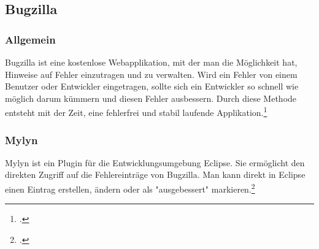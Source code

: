 
\subsection{Bugzilla}

\subsubsection{Allgemein}
Bugzilla ist eine kostenlose Webapplikation, mit der man die Möglichkeit hat, Hinweise auf Fehler einzutragen und zu verwalten. Wird ein Fehler von einem Benutzer oder Entwickler eingetragen, sollte sich ein Entwickler so schnell wie möglich darum kümmern und diesen Fehler ausbessern. Durch diese Methode entsteht mit der Zeit, eine fehlerfrei und stabil laufende Applikation.\footcite[vgl.][]{bugzilla}
\subsubsection{Mylyn}
Mylyn ist ein Plugin für die Entwicklungsumgebung Eclipse. Sie ermöglicht den direkten Zugriff auf die Fehlereinträge von Bugzilla. Man kann direkt in Eclipse einen Eintrag erstellen, ändern oder als "ausgebessert" markieren.\footcite[vgl.][]{mylyn}
